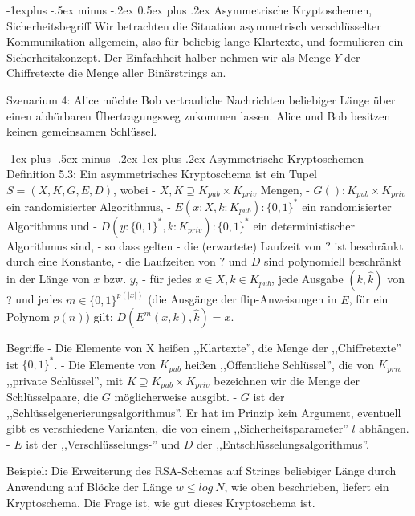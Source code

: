 \documentclass[a4paper]{article}
\makeatletter
\renewcommand{\subsection}{\@startsection{subsection}{2}{0mm}%
 {-1explus -.5ex minus -.2ex}%
 {0.5ex plus .2ex}%
 {\normalfont\normalsize\bfseries}}
\renewcommand{\subsubsection}{\@startsection{subsubsection}{3}{0mm}%
 {-1ex plus -.5ex minus -.2ex}%
 {1ex plus .2ex}%
 {\normalfont\small\bfseries}}
\makeatother
\begin{document}
\begin{multicols}{3}
        \subsection{Asymmetrische Kryptoschemen, Sicherheitsbegriff}
        Wir betrachten die Situation asymmetrisch verschlüsselter Kommunikation allgemein, also für beliebig lange Klartexte, und formulieren ein Sicherheitskonzept. Der Einfachheit halber nehmen wir als Menge $Y$ der Chiffretexte die Menge aller Binärstrings an.

        Szenarium 4: Alice möchte Bob vertrauliche Nachrichten beliebiger Länge über einen abhörbaren Übertragungsweg zukommen lassen. Alice und Bob besitzen keinen gemeinsamen Schlüssel.

        \subsubsection{Asymmetrische Kryptoschemen}
        Definition 5.3: Ein asymmetrisches Kryptoschema ist ein Tupel $S= (X,K,G,E,D)$, wobei
        - $X,K\supseteq K_{pub} \times K_{priv}$ Mengen,
        - $G():K_{pub} \times K_{priv}$ ein randomisierter Algorithmus,
        - $E(x:X,k:K_{pub}):\{0,1\}^*$ ein randomisierter Algorithmus und
        - $D(y:\{0,1\}^*,k:K_{priv}):\{0,1\}^*$ ein deterministischer Algorithmus sind,
        - so dass gelten
        - die (erwartete) Laufzeit von $?$ ist beschränkt durch eine Konstante,
        - die Laufzeiten von $?$ und $D$ sind polynomiell beschränkt in der Länge von $x$ bzw. $y$,
        - für jedes $x\in X,k\in K_{pub}$, jede Ausgabe $(k,\hat{k})$ von $?$ und jedes $m\in\{0,1\}^{p(|x|)}$ (die Ausgänge der flip-Anweisungen in $E$, für ein Polynom $p(n)$) gilt: $D(E^m (x,k), \hat{k}) =x$.

        Begriffe
        - Die Elemente von X heißen ,,Klartexte'', die Menge der ,,Chiffretexte'' ist $\{0,1\}^*$.
        - Die Elemente von $K_{pub}$ heißen ,,Öffentliche Schlüssel'', die von $K_{priv}$ ,,private Schlüssel'', mit $K\supseteq K_{pub} \times K_{priv}$ bezeichnen wir die Menge der Schlüsselpaare, die $G$ möglicherweise ausgibt.
        - $G$ ist der ,,Schlüsselgenerierungsalgorithmus''. Er hat im Prinzip kein Argument, eventuell gibt es verschiedene Varianten, die von einem ,,Sicherheitsparameter'' $l$ abhängen.
        - $E$ ist der ,,Verschlüsselungs-'' und $D$ der ,,Entschlüsselungsalgorithmus''.

        Beispiel: Die Erweiterung des RSA-Schemas auf Strings beliebiger Länge durch Anwendung auf Blöcke der Länge $w\leq log\ N$, wie oben beschrieben, liefert ein Kryptoschema. Die Frage ist, wie gut dieses Kryptoschema ist.


\end{multicols}
\end{document}
